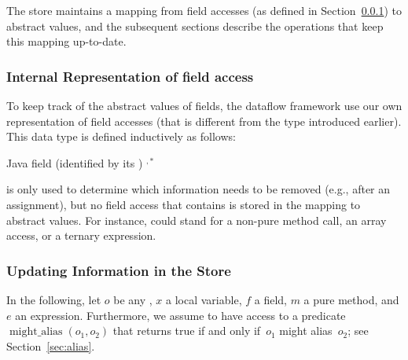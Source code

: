 The store maintains a mapping from field accesses (as defined in Section~\ref{sec:field-access}) to
abstract values, and the subsequent sections describe the operations that
keep this mapping up-to-date.


\subsubsection{Internal Representation of field access}
\label{sec:field-access}

To keep track of the abstract values of fields, the dataflow framework use our own representation
of field accesses
(that is different from the  type introduced earlier).  This
data type is defined inductively as follows:

\begin{bnfgrammar}
        {  \qquad Java field (identified by its )}
        { \qquad {}}
        {  
            \literal{(} $^{,*}$ \literal{)}}
\end{bnfgrammar}

 is only used to determine which
information needs to be removed (e.g., after an assignment), but no field
access that contains  is stored in the mapping to
abstract values.  For instance,  could stand for
a non-pure method call, an array access, or a ternary expression.


\subsubsection{Updating Information in the Store}

\newcommand{\alias}{\operatorname{might\_alias}}

In the following, let $o$ be any ,
$x$ a local variable, $f$ a
field, $m$ a pure method, and $e$ an expression.  Furthermore, we assume to have access to
a predicate $\alias(o_1,o_2)$ that returns true if and only
if~$o_1$ might alias~$o_2$; see Section~\ref{sec:alias}.

